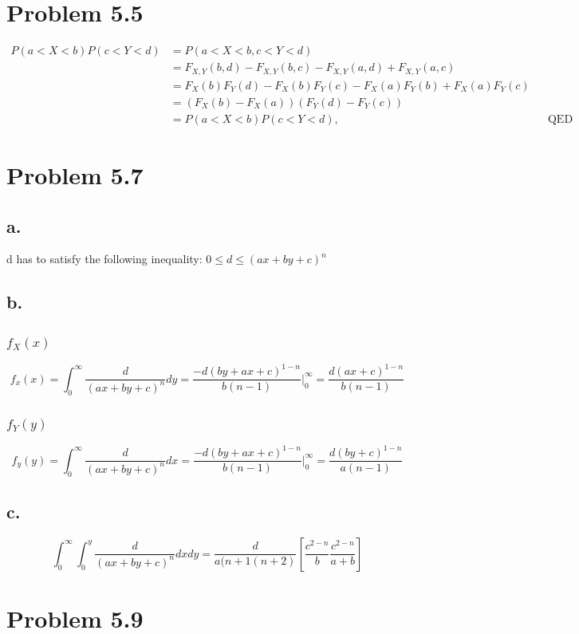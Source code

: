 \documentclass[12pt]{article}
\begin{document}
\section*{Problem 5.5}
\begin{align*}
  P(a<X<b)P(c<Y<d) &= P(a<X<b,c<Y<d) \\
  &= F_{X,Y}(b,d)-F_{X,Y}(b,c)-F_{X,Y}(a,d)+F_{X,Y}(a,c) \\
  &= F_X(b)F_Y(d)-F_X(b)F_Y(c)-F_X(a)F_Y(b)+F_X(a)F_Y(c) \\
  &= (F_X(b)-F_X(a))(F_Y(d)-F_Y(c)) \\
  &= P(a<X<b)P(c<Y<d), & & \textrm{QED}
\end{align*}

\section*{Problem 5.7}
\subsection*{a.}
d has to satisfy the following inequality: $0\leq d \leq (ax+by+c)^n$

\subsection*{b.}
\subsubsection*{$f_X(x)$}
\[f_x(x) = \int_0^\infty \frac{d}{(ax+by+c)^n} dy
  = \frac{-d(by+ax+c)^{1-n}}{b(n-1)}\big|_0^\infty
= \frac{d(ax+c)^{1-n}}{b(n-1)}\]

\subsubsection*{$f_Y(y)$}
\[f_y(y) = \int_0^\infty \frac{d}{(ax+by+c)^n} dx
  = \frac{-d(by+ax+c)^{1-n}}{b(n-1)}\big|_0^\infty
= \frac{d(by+c)^{1-n}}{a(n-1)}\]

\subsection*{c.}
\[\int_0^\infty \int_0^y \frac{d}{(ax+by+c)^n} dxdy 
  = \frac{d}{a(n+1(n+2)}\left[ \frac{c^{2-n}}{b} \frac{c^{2-n}}{a+b}\right]\]

\section*{Problem 5.9}
\end{document}

